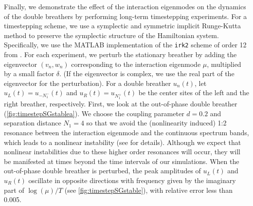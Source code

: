 \documentclass[12pt,reqno]{amsart}
\theoremstyle{definition}
\begin{document}
Finally, we demonstrate the effect of the interaction eigenmodes on the dynamics of the double breathers by performing long-term timestepping experiments. For a timestepping scheme, we use a symplectic and symmetric implicit Runge-Kutta method \cite{HairerBook} to preserve the symplectic structure of the Hamiltonian system. Specifically, we use the MATLAB implementation of the \texttt{irk2} scheme of order 12 from \cite{Hairer2003}.
For each experiment, we perturb the stationary breather by adding the eigenvector $(v_n, w_n)$ corresponding to the interaction eigenmode $\mu$, multiplied by a small factor $\delta$. (If the eigenvector is complex, we use the real part of the eigenvector for the perturbation).
For a double breather $u_n(t)$, let $u_L(t) = u_{-N_1^-}(t)$ and $u_R(t) = u_{N_1^+}(t)$ be the center sites of the left and the right breather, respectively. First, we look at the out-of-phase double breather (\cref{fig:timestepSGstablea}). We choose the coupling parameter $d=0.2$ and separation distance $N_1 = 4$ so that we avoid the (nonlinearity induced) 1:2 resonance between the interaction eigenmode and the continuous spectrum bands, which leads to a nonlinear instability (see \cite{cuevas-maraver2016} for details). 
Although we expect that nonlinear instabilities due to these higher order resonances will occur, they will be manifested at times beyond the time intervals of our simulations. 
When the out-of-phase double breather is perturbed, the peak amplitudes of $u_L(t)$ and $u_R(t)$ oscillate in opposite directions with frequency given by the imaginary part of $\log(\mu)/T$ (see \cref{fig:timestepSGstable}), with relative error less than 0.005. 
\end{document}

